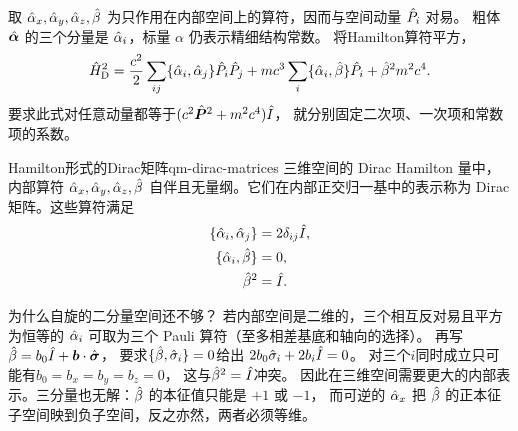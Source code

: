 取 $\hat{\alpha}_x,\hat{\alpha}_y,\hat{\alpha}_z,\hat{\beta}$ 为只作用在内部空间上的算符，因而与空间动量 $\hat{P}_i$ 对易。
粗体 $\hat{\bm{\alpha}}$ 的三个分量是 $\hat{\alpha}_i$，标量 $\alpha$ 仍表示精细结构常数。
将Hamilton算符平方，
\[
    \hat{H}_{\mathrm{D}}^2 =
    \frac{c^2}{2}\sum_{ij}\{\hat{\alpha}_i,\hat{\alpha}_j\}\hat{P}_i\hat{P}_j
    + mc^3\sum_i\{\hat{\alpha}_i,\hat{\beta}\}\hat{P}_i
    + \hat{\beta}^2m^2c^4.
\]
要求此式对任意动量都等于$(c^2\hat{\bm{P}}^2 + m^2c^4)\hat{I}$，
就分别固定二次项、一次项和常数项的系数。

\begin{definition}{Hamilton形式的Dirac矩阵}{qm-dirac-matrices}
    三维空间的 Dirac Hamilton 量中，内部算符 $\hat{\alpha}_x,\hat{\alpha}_y,\hat{\alpha}_z,\hat{\beta}$ 自伴且无量纲。它们在内部正交归一基中的表示称为 Dirac 矩阵。这些算符满足
    \begin{subequations}
        \begin{align}
            \{\hat{\alpha}_i,\hat{\alpha}_j\} &= 2\delta_{ij}\hat{I},\\
            \{\hat{\alpha}_i,\hat{\beta}\} &= 0,\\
            \hat{\beta}^2 &= \hat{I}.
        \end{align}
    \end{subequations}
\end{definition}
为什么自旋的二分量空间还不够？
若内部空间是二维的，三个相互反对易且平方为恒等的 $\hat{\alpha}_i$ 可取为三个 Pauli 算符（至多相差基底和轴向的选择）。
再写$\hat{\beta} = b_0\hat{I} + \bm b \cdot \hat{\bm{\sigma}}$，
要求$\{\hat{\beta},\hat{\sigma}_i\} = 0$给出
$2b_0\hat{\sigma}_i + 2b_i\hat{I} = 0$。
对三个$i$同时成立只可能有$b_0 = b_x = b_y = b_z = 0$，
这与$\hat{\beta}^2 = \hat{I}$冲突。
因此在三维空间需要更大的内部表示。三分量也无解：$\hat{\beta}$ 的本征值只能是 $+1$ 或 $-1$，
而可逆的 $\hat{\alpha}_x$ 把 $\hat{\beta}$ 的正本征子空间映到负子空间，反之亦然，两者必须等维。

